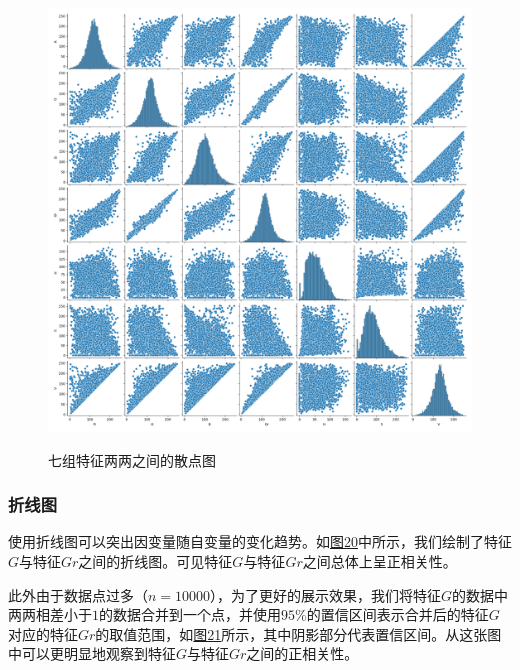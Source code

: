 \documentclass[UTF8]{ctexart}
\begin{document}
	\begin{figure}[htbp]
		\centering
		\caption{七组特征两两之间的散点图}
		\includegraphics[width=1.0\textwidth]{pair_plot.png}
		\label{Fig.19}
	\end{figure}

	\subsubsection{折线图}
	使用折线图可以突出因变量随自变量的变化趋势。如\hyperref[Fig.20]{图20}中所示，我们绘制了特征$G$与特征$Gr$之间的折线图。可见特征$G$与特征$Gr$之间总体上呈正相关性。
	
	此外由于数据点过多（$n=10000$），为了更好的展示效果，我们将特征$G$的数据中两两相差小于$1$的数据合并到一个点，并使用$95\%$的置信区间表示合并后的特征$G$对应的特征$Gr$的取值范围，如\hyperref[Fig.21]{图21}所示，其中阴影部分代表置信区间。从这张图中可以更明显地观察到特征$G$与特征$Gr$之间的正相关性。
	
\end{document}

